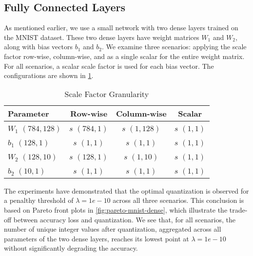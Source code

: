 \subsection{Fully Connected Layers}
\label{subsec:paretofrontsdense}
\hspace*{1em}As mentioned earlier, we use a small network with two dense layers trained on the MNIST dataset. 
These two dense layers have weight matrices \( W_1 \) and \( W_2 \),
along with bias vectors \( b_1 \) and \( b_2 \).
We examine three scenarios:
applying the scale factor row-wise, 
column-wise, and as a single scalar for the entire weight matrix.
For all scenarios, a scalar scale factor is used for each bias vector. 
The configurations are shown in \cref{tab:scalefactorgranularitydense}.

\begin{table}[b!]
  \centering
  \caption{Scale Factor Granularity}
  \label{tab:scalefactorgranularitydense}
  \begin{tabular}{lccc}
    \toprule
    \textbf{Parameter}             & \textbf{Row-wise}       & \textbf{Column-wise}       & \textbf{Scalar}       \\ 
    \midrule
    \( W_1 \) \( (784, 128) \) & \( s \) \( (784, 1) \)        & \( s \) \( (1, 128) \)           & \( s \) \( (1, 1) \)         \\ 
    \( b_1 \) \( (128, 1) \)   & \( s \) \( (1, 1) \)          & \( s \) \( (1, 1) \)             & \( s \) \( (1, 1) \)         \\ 
    \( W_2 \) \( (128, 10) \)  & \( s \) \( (128, 1) \)        & \( s \) \( (1, 10) \)            & \( s \) \( (1, 1) \)         \\ 
    \( b_2 \) \( (10, 1) \)    & \( s \) \( (1, 1) \)          & \( s \) \( (1, 1) \)             & \( s \) \( (1, 1) \)         \\ 
    \bottomrule
  \end{tabular}
  \vspace{0.5em}
\end{table}


The experiments have demonstrated that the optimal quantization is observed for a penalthy threshold of 
\( \lambda = 1e-10 \) across all three scenarios.
This conclusion is based on Pareto front plots in \cref{fig:pareto-mnist-dense},
which illustrate the trade-off between accuracy loss and quantization.
We see that, for all scenarios, 
the number of unique integer values after quantization, 
aggregated across all parameters of the two dense layers, reaches its lowest point at \( \lambda = 1e-10 \)
without significantly degrading the accuracy.

